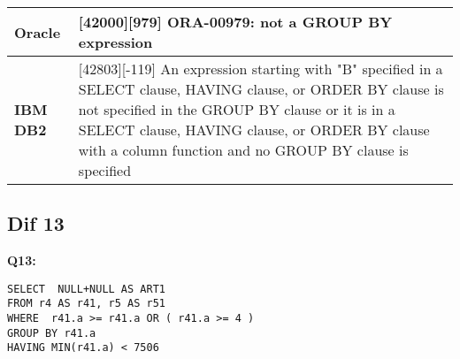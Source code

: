 \begin{table}[h]
\begin{tabular}{|p{2cm}|p{12cm}|}
\textbf{Oracle}                            & {[}42000{]}{[}979{]} ORA-00979: not a GROUP BY expression                                                                                                                                                                                                                               \\ \hline
\textbf{IBM DB2}                           & {[}42803{]}{[}-119{]} An expression starting with "B" specified in a SELECT clause, HAVING clause, or ORDER BY clause is not specified in the GROUP BY clause or it is in a SELECT clause, HAVING clause, or ORDER BY clause with a column function and no GROUP BY clause is specified \\ \hline
\end{tabular}
\end{table}


\subsection{Dif 13}
 
\begin{mdframed}[backgroundcolor=lightgray!20] 
\textbf{Q13:}
\begin{lstlisting}
SELECT  NULL+NULL AS ART1
FROM r4 AS r41, r5 AS r51
WHERE  r41.a >= r41.a OR ( r41.a >= 4 )
GROUP BY r41.a
HAVING MIN(r41.a) < 7506
\end{lstlisting}
\end{mdframed} 

